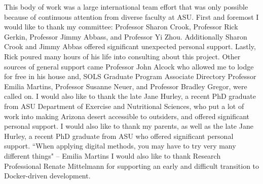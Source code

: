 This body of work was a large international team effort that was only possible because of continuous attention from diverse faculty at ASU. 
\linebreak 
\linebreak 
First and foremost I would like to thank my committee: Professor Sharon Crook, Professor Rick Gerkin, Professor Jimmy Abbass, and Professor Yi Zhou. 
Additionally Sharon Crook and Jimmy Abbas offered significant unexpected personal support.
Lastly, Rick poured many hours of his life into consulting about this project.
\linebreak 
\linebreak 
Other sources of general support came Professor John Alcock who allowed me to lodge for free in his house and, SOLS Graduate Program Associate Directory Professor Emilia Martins, Professor Susanne Neuer, and Professor Bradley Gregor, were called on.
\linebreak 
\linebreak 
I would also like to thank the late Jane Hurley, a recent PhD graduate from ASU Department of Exercise and Nutritional Sciences, who put a lot of work into making Arizona desert accessible to outsiders, and offered significant personal support.
\linebreak 
\linebreak 
I would also like to thank my parents, as well as the late Jane Hurley, a recent PhD graduate from ASU who offered significant personal support.
\linebreak 
\linebreak 
``When applying digital methods, you may have to try very many different things" -- Emilia Martins
\linebreak 
\linebreak 
I would also like to thank Research Professional Renate Mittelmann for supporting an early and difficult transition to Docker-driven development.

